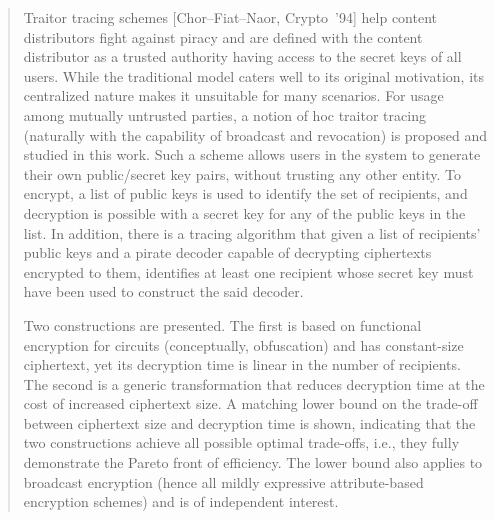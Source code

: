 \begin{abstract}
Traitor tracing schemes [Chor--Fiat--Naor, Crypto~'94] help content distributors fight against piracy and
are defined with the content distributor as a trusted authority having access to the secret keys of all users.
While the traditional model caters well to its original motivation,
its centralized nature makes it unsuitable for many scenarios.
For usage among mutually untrusted parties,
a notion of \ad hoc traitor tracing (naturally with the capability of broadcast and revocation) is proposed and studied in this work.
Such a scheme allows users in the system to generate their own public/secret key pairs, without trusting any other entity.
To encrypt, a list of public keys is used to identify the set of recipients, and decryption is possible with a secret key for any of the public keys in the list.
In addition, there is a tracing algorithm that given a list of recipients' public keys and a pirate decoder capable of decrypting ciphertexts encrypted to them, identifies at least one recipient whose secret key must have been used to construct the said decoder.

\abstractparindent
Two constructions are presented.
The first is based on functional encryption for circuits (conceptually, obfuscation) and has constant-size ciphertext, yet its decryption time is linear in the number of recipients.
The second is a generic transformation that reduces decryption time at the cost of increased ciphertext size.
A matching lower bound on the trade-off between ciphertext size and decryption time is shown, indicating that the two constructions achieve all possible optimal trade-offs, i.e., they fully demonstrate the Pareto front of efficiency.
The lower bound also applies to broadcast encryption (hence all mildly expressive attribute-based encryption schemes) and is of independent interest.


\end{abstract}
